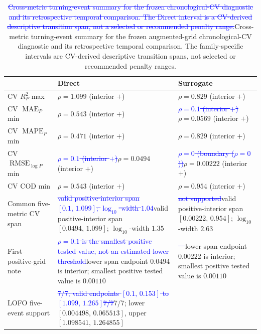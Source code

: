 \documentclass[10pt]{article}
\theoremstyle{definition}
\newcommand{\1}{\mathbf{1}}
\newcommand{\oldtext}[1]{\textcolor{blue}{\sout{#1}}}
\newcommand{\latesttext}[1]{\textcolor{latestPurple}{#1}}
\begin{document}
\begin{table}[!htbp]
\centering
\scriptsize
\setlength{\tabcolsep}{3.2pt}
\renewcommand{\arraystretch}{1.08}
\caption{\oldtext{Cross-metric turning-event summary for the frozen chronological-CV diagnostic and its retrospective temporal comparison. The Direct interval is a CV-derived descriptive transition span, not a selected or recommended penalty range.}\latesttext{Cross-metric turning-event summary for the frozen augmented-grid chronological-CV diagnostic and its retrospective temporal comparison. The family-specific intervals are CV-derived descriptive transition spans, not selected or recommended penalty ranges.}}
\label{tab:transition_summary}
\begin{tabularx}{\textwidth}{@{} l >{\raggedright\arraybackslash}X >{\raggedright\arraybackslash}X @{}}
\toprule
& \textbf{Direct} & \textbf{Surrogate} \\
\midrule
CV $R^2_P$ max & $\rho=1.099$ (interior $+$)
& $\rho=0.829$ (interior $+$) \\
CV $\operatorname{MAE}_P$ min & $\rho=0.543$ (interior $+$)
& \oldtext{$\rho=0.1$ (interior $+$)}\latesttext{$\rho=0.0569$ (interior $+$)} \\
CV $\operatorname{MAPE}_P$ min & $\rho=0.471$ (interior $+$)
& $\rho=0.829$ (interior $+$) \\
CV $\operatorname{RMSE}_{\log P}$ min & \oldtext{$\rho=0.1$ (interior $+$)}\latesttext{$\rho=0.0494$ (interior $+$)}
& \oldtext{$\rho=0$ (boundary ($\rho=0$))}\latesttext{$\rho=0.00222$ (interior $+$)} \\
CV COD min & $\rho=0.543$ (interior $+$)
& $\rho=0.954$ (interior $+$) \\
\addlinespace
Common five-metric CV span
& \oldtext{valid positive-interior span $[0.1,\,1.099]$; $\log_{10}$-width $1.04$}\latesttext{valid positive-interior span $[0.0494,\,1.099]$; $\log_{10}$-width $1.35$}
& \oldtext{not supported}\latesttext{valid positive-interior span $[0.00222,\,0.954]$; $\log_{10}$-width $2.63$} \\
First-positive-grid note
& \oldtext{$\rho=0.1$ is the smallest positive tested value, not an estimated lower threshold}\latesttext{lower span endpoint $0.0494$ is interior; smallest positive tested value is $0.00110$}
& \oldtext{---}\latesttext{lower span endpoint $0.00222$ is interior; smallest positive tested value is $0.00110$} \\
LOFO five-event support
& \oldtext{7/7; valid endpoints $[0.1,\,0.153]$ to $[1.099,\,1.265]$}\oldtext{7/7}\latesttext{7/7; lower $[0.004498,\,0.065513]$, upper $[1.098541,\,1.264855]$}

\end{tabularx}
\end{table}
\end{document}
